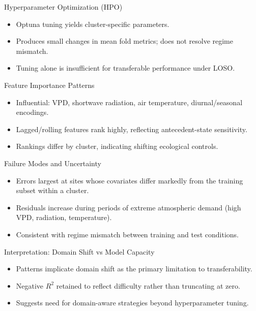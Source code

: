 \documentclass{beamer}
\begin{document}
\begin{frame}{Hyperparameter Optimization (HPO)}
  \begin{itemize}
    \item Optuna tuning yields cluster-specific parameters.
    \item Produces small changes in mean fold metrics; does not resolve regime mismatch.
    \item Tuning alone is insufficient for transferable performance under LOSO.
  \end{itemize}
\end{frame}

\begin{frame}{Feature Importance Patterns}
  \begin{itemize}
    \item Influential: VPD, shortwave radiation, air temperature, diurnal/seasonal encodings.
    \item Lagged/rolling features rank highly, reflecting antecedent-state sensitivity.
    \item Rankings differ by cluster, indicating shifting ecological controls.
  \end{itemize}
\end{frame}

\begin{frame}{Failure Modes and Uncertainty}
  \begin{itemize}
    \item Errors largest at sites whose covariates differ markedly from the training subset within a cluster.
    \item Residuals increase during periods of extreme atmospheric demand (high VPD, radiation, temperature).
    \item Consistent with regime mismatch between training and test conditions.
  \end{itemize}
\end{frame}

\begin{frame}{Interpretation: Domain Shift vs Model Capacity}
  \begin{itemize}
    \item Patterns implicate domain shift as the primary limitation to transferability.
    \item Negative \(R^2\) retained to reflect difficulty rather than truncating at zero.
    \item Suggests need for domain-aware strategies beyond hyperparameter tuning.
  \end{itemize}
\end{frame}
\end{document}
